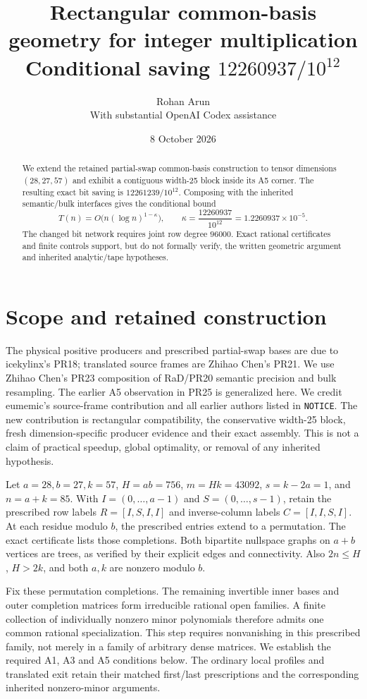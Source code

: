 \documentclass[11pt]{article}
\title{Rectangular common-basis geometry for integer multiplication\\\large Conditional saving $12260937/10^{12}$}
\author{Rohan Arun\\\small With substantial OpenAI Codex assistance}
\date{8 October 2026}
\begin{document}
\maketitle
\begin{abstract}
We extend the retained partial-swap common-basis construction to tensor dimensions $(28,27,57)$ and exhibit a contiguous width-25 block inside its A5 corner. The resulting exact bit saving is $12261239/10^{12}$. Composing with the inherited semantic/bulk interfaces gives the conditional bound
\[
T(n)=O\bigl(n(\log n)^{1-\kappa}\bigr),\qquad
\kappa=\frac{12260937}{10^{12}}=1.2260937\times10^{-5}.
\]
The changed bit network requires joint row degree $96000$. Exact rational certificates and finite controls support, but do not formally verify, the written geometric argument and inherited analytic/tape hypotheses.
\end{abstract}

\section{Scope and retained construction}
The physical positive producers and prescribed partial-swap bases are due to icekylinx's PR18; translated source frames are Zhihao Chen's PR21. We use Zhihao Chen's PR23 composition of RaD/PR20 semantic precision and bulk resampling. The earlier A5 observation in PR25 is generalized here. We credit eumemic's source-frame contribution and all earlier authors listed in \texttt{NOTICE}. The new contribution is rectangular compatibility, the conservative width-25 block, fresh dimension-specific producer evidence and their exact assembly. This is not a claim of practical speedup, global optimality, or removal of any inherited hypothesis.

Let $a=28,b=27,k=57$, $H=ab=756$, $m=Hk=43092$, $s=k-2a=1$, and $n=a+k=85$. With $I=(0,\ldots,a-1)$ and $S=(0,\ldots,s-1)$, retain the prescribed row labels $R=[I,S,I,I]$ and inverse-column labels $C=[I,I,S,I]$. At each residue modulo $b$, the prescribed entries extend to a permutation. The exact certificate lists those completions. Both bipartite nullspace graphs on $a+b$ vertices are trees, as verified by their explicit edges and connectivity. Also $2n\leq H$, $H>2k$, and both $a,k$ are nonzero modulo $b$.

Fix these permutation completions. The remaining invertible inner bases and outer completion matrices form irreducible rational open families. A finite collection of individually nonzero minor polynomials therefore admits one common rational specialization. This step requires nonvanishing in this prescribed family, not merely in a family of arbitrary dense matrices. We establish the required A1, A3 and A5 conditions below. The ordinary local profiles and translated exit retain their matched first/last prescriptions and the corresponding inherited nonzero-minor arguments.
\end{document}
